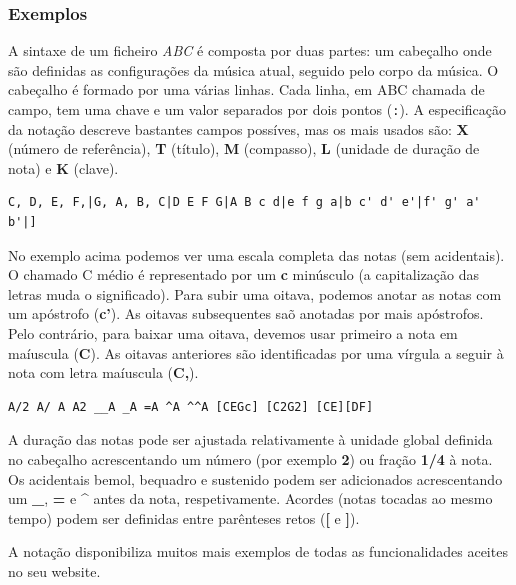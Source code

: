 \documentclass[
  oneside,
  11pt, a4paper,
  footinclude=true,
  headinclude=true,
  cleardoublepage=empty
]{scrbook}
\begin{document}
		\subsubsection{Exemplos}
	A sintaxe de um ficheiro \textit{ABC} é composta por duas partes: um cabeçalho onde são definidas as configurações da música atual, seguido pelo corpo da música. O cabeçalho é formado por uma várias linhas. Cada linha, em ABC chamada de campo, tem uma chave e um valor separados por dois pontos (\texttt{:}). A especificação da notação descreve bastantes campos possíves, mas os mais usados são: \textbf{X} (número de referência), \textbf{T} (título), \textbf{M} (compasso), \textbf{L} (unidade de duração de nota) e \textbf{K} (clave).
	
	\begin{lstlisting}[backgroundcolor=\color{transparent},caption={Exemplo da notação ABC},captionpos=b,xleftmargin=.1\textwidth]
	C, D, E, F,|G, A, B, C|D E F G|A B c d|e f g a|b c' d' e'|f' g' a' b'|]
	\end{lstlisting}
	
	No exemplo acima podemos ver uma escala completa das notas (sem acidentais). O chamado C médio é representado por um \textbf{c} minúsculo (a capitalização das letras muda o significado). Para subir uma oitava, podemos anotar as notas com um apóstrofo (\textbf{c'}). As oitavas subsequentes saõ anotadas por mais apóstrofos. Pelo contrário, para baixar uma oitava, devemos usar primeiro a nota em maíuscula (\textbf{C}). As oitavas anteriores são identificadas por uma vírgula a seguir à nota com letra maíuscula (\textbf{C,}).
	
	
	\begin{lstlisting}[backgroundcolor=\color{transparent},caption={Exemplo da notação ABC},captionpos=b,xleftmargin=.24\textwidth]
	A/2 A/ A A2 __A _A =A ^A ^^A [CEGc] [C2G2] [CE][DF]
	\end{lstlisting}
	A duração das notas pode ser ajustada relativamente à unidade global definida no cabeçalho acrescentando um número (por exemplo \textbf{2}) ou fração \textbf{1/4} à nota. Os acidentais bemol, bequadro e sustenido podem ser adicionados acrescentando um \textbf{\_}, \textbf{=} e \textbf{\^} antes da nota, respetivamente. Acordes (notas tocadas ao mesmo tempo) podem ser definidas entre parênteses retos (\textbf{[} e \textbf{]}).
	
	A notação disponibiliza muitos mais exemplos de todas as funcionalidades aceites no seu website\cite{abc-notation-examples}.
	
\end{document}
